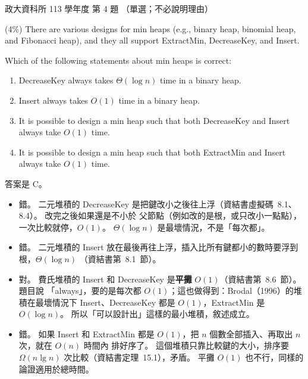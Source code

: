\begin{pastexam}[label={px:nccu-113-dsa-04}]{政大資科所 113 學年度 第 4 題}
（單選；不必說明理由）

(4\%) There are various designs for min heaps (e.g., binary heap, binomial heap, and Fibonacci heap), and
they all support ExtractMin, DecreaseKey, and Insert.

Which of the following statements about min heaps is correct:
\begin{enumerate}[label=\Alph*.]
\item DecreaseKey always takes $\Theta(\log n)$ time in a binary heap.
\item Insert always takes $O(1)$ time in a binary heap.
\item It is possible to design a min heap such that both DecreaseKey and Insert always take $O(1)$ time.
\item It is possible to design a min heap such that both ExtractMin and Insert always take $O(1)$ time.
\end{enumerate}
\end{pastexam}

\begin{pastsoln}
答案是 C。

\begin{itemize}
\item[A.] 錯。 二元堆積的 DecreaseKey 是把鍵改小之後往上浮（資結書虛擬碼~8.1、8.4）。 改完之後如果還是不小於
父節點（例如改的是根，或只改小一點點），一次比較就停，$O(1)$。 $\Theta(\log n)$ 是最壞情況，不是「每次都」。
\item[B.] 錯。 二元堆積的 Insert 放在最後再往上浮，插入比所有鍵都小的數時要浮到根，$\Theta(\log n)$
（資結書第~8.1~節）。
\item[C.] 對。 費氏堆積的 Insert 和 DecreaseKey 是\textbf{平攤} $O(1)$（資結書第~8.6~節）。 題目說
「always」，要的是每次都 $O(1)$；這也做得到：Brodal（1996）的堆積在最壞情況下 Insert、DecreaseKey 都是
$O(1)$，ExtractMin 是 $O(\log n)$。 所以「可以設計出」這樣的最小堆積，敘述成立。
\item[D.] 錯。 如果 Insert 和 ExtractMin 都是 $O(1)$，把 $n$ 個數全部插入、再取出 $n$ 次，就在 $O(n)$ 時間內
排好序了。 這個堆積只靠比較鍵的大小，排序要 $\Omega(n \lg n)$ 次比較（資結書定理~15.1），矛盾。 平攤 $O(1)$
也不行，同樣的論證適用於總時間。
\end{itemize}
\end{pastsoln}
